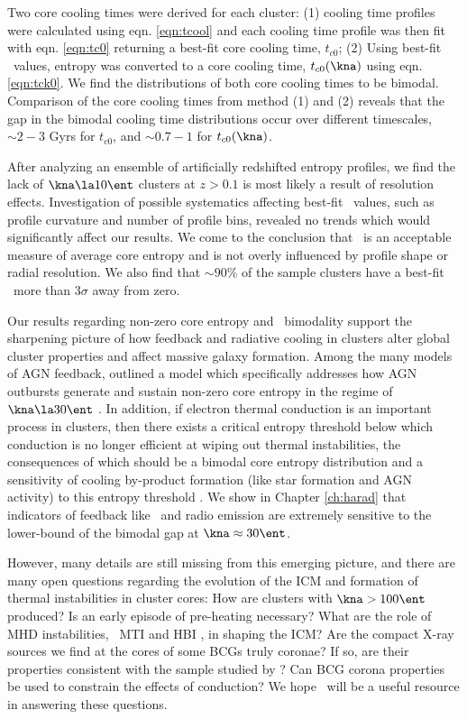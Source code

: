 Two core cooling times were derived for each cluster: (1) cooling time
profiles were calculated using eqn. \ref{eqn:tcool} and each cooling
time profile was then fit with eqn. \ref{eqn:tc0} returning a best-fit
core cooling time, $t_{c0}$; (2) Using best-fit \kna\ values, entropy
was converted to a core cooling time, $t_{c0}(\kna)$ using
eqn. \ref{eqn:tck0}. We find the distributions of both core cooling
times to be bimodal. Comparison of the core cooling times from method
(1) and (2) reveals that the gap in the bimodal cooling time
distributions occur over different timescales, $\sim 2-3$ Gyrs for
$t_{c0}$, and $\sim 0.7-1$ for $t_{c0}(\kna)$.

After analyzing an ensemble of artificially redshifted entropy
profiles, we find the lack of $\kna \la 10 \ent$ clusters at $z > 0.1$
is most likely a result of resolution effects. Investigation of
possible systematics affecting best-fit \kna\ values, such as profile
curvature and number of profile bins, revealed no trends which would
significantly affect our results. We come to the conclusion that
\kna\ is an acceptable measure of average core entropy and is not
overly influenced by profile shape or radial resolution. We also find
that $\sim90\%$ of the sample clusters have a best-fit \kna\ more than
$3\sigma$ away from zero.

Our results regarding non-zero core entropy and \kna\ bimodality
support the sharpening picture of how feedback and radiative cooling
in clusters alter global cluster properties and affect massive galaxy
formation. Among the many models of AGN feedback, \citet{agnframework}
outlined a model which specifically addresses how AGN outbursts
generate and sustain non-zero core entropy in the regime of $\kna \la
30 \ent$ \citep[see also][]{kaiser03}. In addition, if electron
thermal conduction is an important process in clusters, then there
exists a critical entropy threshold below which conduction is no
longer efficient at wiping out thermal instabilities, the consequences
of which should be a bimodal core entropy distribution and a
sensitivity of cooling by-product formation (like star formation and
AGN activity) to this entropy threshold \citep{conduction,
  2008arXiv0804.3823G}. We show in Chapter \ref{ch:harad} that
indicators of feedback like \halpha\ and radio emission are extremely
sensitive to the lower-bound of the bimodal gap at $\kna \approx 30
\ent$.

However, many details are still missing from this emerging picture,
and there are many open questions regarding the evolution of the ICM
and formation of thermal instabilities in cluster cores: How are
clusters with $\kna > 100 \ent$ produced? Is an early episode of
pre-heating necessary? What are the role of MHD instabilities, \eg\
MTI \citep{2000ApJ...534..420B, 2008ApJ...673..758Q} and HBI
\citep{2008ApJ...677L...9P}, in shaping the ICM?  Are the compact
X-ray sources we find at the cores of some BCGs truly coronae? If so,
are their properties consistent with the sample studied by
\citet{coronae}? Can BCG corona properties be used to constrain the
effects of conduction? We hope \accept\ will be a useful resource in
answering these questions.

